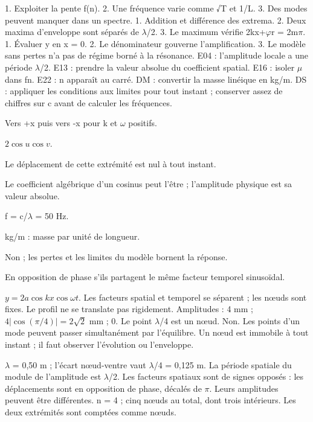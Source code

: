 1. Exploiter la pente f(n). 2. Une fréquence varie comme √T et 1/L. 3. Des modes peuvent manquer dans un spectre.
1. Addition et différence des extrema. 2. Deux maxima d’enveloppe sont séparés de \ensuremath{\lambda}/2. 3. Le maximum vérifie 2kx+\ensuremath{\varphi}r = 2m\ensuremath{\pi}.
1. Évaluer y en x = 0. 2. Le dénominateur gouverne l’amplification. 3. Le modèle sans pertes n’a pas de régime borné à la résonance.
E04 : l’amplitude locale a une période \ensuremath{\lambda}/2. E13 : prendre la valeur absolue du coefficient spatial. E16 : isoler \ensuremath{\mu} dans fn. E22 : n apparaît au carré.
DM : convertir la masse linéique en kg/m. DS : appliquer les conditions aux limites pour tout instant ; conserver assez de chiffres sur c avant de calculer les fréquences.


Vers +x puis vers -x pour k et \ensuremath{\omega} positifs.

$2\cos u\cos v$.

Le déplacement de cette extrémité est nul à tout instant.

Le coefficient algébrique d’un cosinus peut l’être ; l’amplitude physique est sa valeur absolue.

f = c/\ensuremath{\lambda} = 50 Hz.

kg/m : masse par unité de longueur.

Non ; les pertes et les limites du modèle bornent la réponse.

En opposition de phase s’ils partagent le même facteur temporel sinusoïdal.


$y=2a\cos kx\cos\omega t$. Les facteurs spatial et temporel se séparent ; les nœuds sont fixes. Le profil ne se translate pas rigidement.
Amplitudes : 4 mm ; $4|\cos(\pi/4)|=2\sqrt2$ mm ; 0. Le point \ensuremath{\lambda}/4 est un nœud.
Non. Les points d’un mode peuvent passer simultanément par l’équilibre. Un nœud est immobile à tout instant ; il faut observer l’évolution ou l’enveloppe.


\ensuremath{\lambda} = 0,50 m ; l’écart nœud-ventre vaut \ensuremath{\lambda}/4 = 0,125 m. La période spatiale du module de l’amplitude est \ensuremath{\lambda}/2.
Les facteurs spatiaux sont de signes opposés : les déplacements sont en opposition de phase, décalés de \ensuremath{\pi}. Leurs amplitudes peuvent être différentes.
n = 4 ; cinq nœuds au total, dont trois intérieurs. Les deux extrémités sont comptées comme nœuds.


